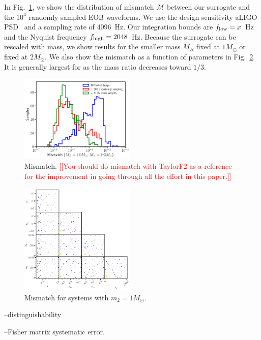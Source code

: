 \documentclass[prd,aps,letter,twocolumn,floatfix,notitlepage,nofootinbib]{revtex4-1}
\newcommand{\red}[1]{\textcolor{red}{#1}}
\begin{document}
In Fig.~\ref{fig:mismatch}, we show the distribution of mismatch $\mathcal{M}$ between our surrogate
and the $10^4$ randomly sampled EOB waveforms. We use the design sensitivity aLIGO PSD~\cite{Aasi:2013wya} and
a sampling rate of 4096~Hz. Our integration bounds are $f_{\rm low} = x$~Hz and the Nyquist frequency
$f_{\rm high} = 2048$~Hz. Because the surrogate can be rescaled with mass,
we show results for the smaller mass $M_B$ fixed at $1M_\odot$ or fixed at $2M_\odot$.
We also show the mismatch as a function of parameters in Fig.~\ref{fig:mismatchtriangle}.
It is generally largest for as the mass ratio decreases toward $1/3$.


\begin{figure}[htb]
\centering
\includegraphics[width=0.49\textwidth]{mismatch.png}
\caption{Mismatch. \red{[[You should do mismatch with TaylorF2 as a reference for the improvement in 
going through all the effort in this paper.]]}
}
\label{fig:mismatch}
\end{figure}

\begin{figure}[htb]
\centering
\includegraphics[width=0.49\textwidth]{mismatchtrianglem10.png}
\caption{Mismatch for systems with $m_2=1M_\odot$.}
\label{fig:mismatchtriangle}
\end{figure}


--distinguishability

--Fisher matrix systematic error.
\end{document}
